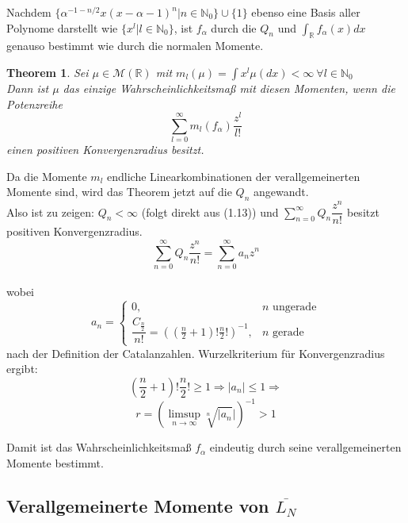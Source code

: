 \documentclass[a4paper, 11pt]{scrreprt}
\newtheorem{theorem}[defi]{Theorem}
\newcommand{\RR}{\mathbb{R}}
\newcommand{\NN}{\mathbb{N}}
\begin{document}
Nachdem $\lbrace \alpha^{-1-n/2} x(x-\alpha -1)^n \vert n \in \NN_{0}\rbrace \cup \lbrace 1 \rbrace$ ebenso eine Basis aller Polynome darstellt wie $ \lbrace x^l \vert l \in \NN_{0} \rbrace $, ist $ f_{\alpha} $ durch die $ Q_n $ und $ \int_{\RR} f_{\alpha}(x)dx $ genauso bestimmt wie durch die normalen Momente. 

\begin{theorem}
Sei $ \mu \in \mathcal{M}(\RR) $ mit $ m_l (\mu)=\int x^l \mu(dx) < \infty~ \forall l \in \NN_{0} $\\
Dann ist $ \mu $ das einzige Wahrscheinlichkeitsmaß mit diesen Momenten, wenn die Potenzreihe 
\[\sum_{l=0}^\infty m_l(f_\alpha) \frac{z^l}{l!}\]
einen positiven Konvergenzradius besitzt.
\end{theorem}

Da die Momente $ m_l $ endliche Linearkombinationen der verallgemeinerten Momente sind, wird das Theorem jetzt auf die $ Q_n $ angewandt.\\
Also ist zu zeigen: $ Q_n< \infty $ (folgt direkt aus (1.13)) und $ \sum_{n=0}^{\infty} Q_n \dfrac{z^n}{n!}$ besitzt positiven Konvergenzradius.\\
\[ \sum_{n=0}^{\infty} Q_n \dfrac{z^n}{n!}= \sum_{n=0}^{\infty} a_n z^n\]\\
wobei \[ a_n=\begin{cases} 0, &n\text{ ungerade}\\
	\dfrac{C_{\frac n 2}}{n!}=((\frac{n}{2}+1)!\frac{n}{2}!)^{-1}, &n\text{ gerade} \end{cases} \]
	nach der Definition der Catalanzahlen.
	Wurzelkriterium für Konvergenzradius ergibt: 
	\[(\frac{n}{2}+1)!\frac{n}{2}! \geq 1 \Rightarrow \vert a_n \vert \leq 1 \Rightarrow \]
	\[ r=(\limsup_{n \to \infty} \sqrt[n]{\vert a_n} \vert )^{-1} >1 \]

Damit ist das Wahrscheinlichkeitsmaß $f_\alpha  $ eindeutig durch seine verallgemeinerten Momente bestimmt.

\subsection*{Verallgemeinerte Momente von $ \overline{L_N} $}
\end{document}

